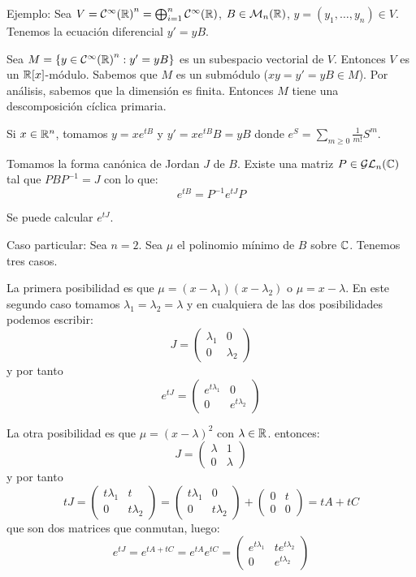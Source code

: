 Ejemplo: Sea \(V={\mathcal{C}^\infty(\mathbb{R})}^n=\bigoplus_{i=1}^n\mathcal{C}^\infty(\mathbb{R})\),
\(B\in\mathcal{M}_n(\mathbb{R})\), \(y=(y_1,\ldots,y_n)\in V\).
Tenemos la ecuación diferencial \(y'=yB\).

Sea \(M=\{y\in{\mathcal{C}^\infty(\mathbb{R})}^n: y'=yB\}\) es un subespacio vectorial
de \(V\). Entonces \(V\) es un \(\mathbb{R}[x]\)-módulo. Sabemos que \(M\)
es un submódulo (\(xy=y'=yB\in M\)). Por análisis, sabemos que
la dimensión es finita. Entonces \(M\) tiene una descomposición cíclica
primaria.

Si \(x\in\mathbb{R}^n\), tomamos \(y=xe^{tB}\) y \(y'=xe^{tB}B=yB\)
donde \(e^S=\sum_{m\ge 0}\frac{1}{m!}S^m\).

Tomamos la forma canónica de Jordan \(J\) de \(B\). Existe una matriz
\(P\in\mathcal{GL}_n(\mathbb{C})\) tal que \(PBP^{-1}=J\) con lo que:
\[
  e^{tB}=P^{-1}e^{tJ}P
\]

Se puede calcular \(e^{tJ}\).

Caso particular: Sea \(n=2\). Sea \(\mu\) el polinomio mínimo de \(B\)
sobre \(\mathbb{C}\). Tenemos tres casos.

La primera posibilidad es que \(\mu=(x-\lambda_1)(x-\lambda_2)\)
o \(\mu=x-\lambda\). En este segundo caso tomamos \(\lambda_1
=\lambda_2=\lambda\) y en cualquiera de las dos posibilidades
podemos escribir:
\[
  J=\begin{pmatrix}
    \lambda_1& 0\\
    0&         \lambda_2
  \end{pmatrix}
\]
y por tanto
\[
  e^{tJ}=\begin{pmatrix}
    e^{t\lambda_1}& 0\\
    0&         e^{t\lambda_2}
  \end{pmatrix}
\]

La otra posibilidad es que \(\mu={(x-\lambda)}^2\) con \(\lambda\in\mathbb{R}\).
entonces:
\[
  J=\begin{pmatrix}
    \lambda& 1\\
    0&         \lambda
  \end{pmatrix}
\]
y por tanto
\[
  tJ=\begin{pmatrix}
    {t\lambda_1}& t\\
    0&         {t\lambda_2}
  \end{pmatrix}=
  \begin{pmatrix}
    {t\lambda_1}& 0\\
    0&         {t\lambda_2}
  \end{pmatrix}
  +
  \begin{pmatrix}
    0& t\\
    0& 0
  \end{pmatrix}
  =
  tA+tC
\]
que son dos matrices que conmutan, luego:
\[
  e^{tJ}=
  e^{tA+tC}=
  e^{tA}e^{tC}
  =
  \begin{pmatrix}
    e^{t\lambda_1}& te^{t\lambda_2}\\
    0&         e^{t\lambda_2}
  \end{pmatrix}
\]

